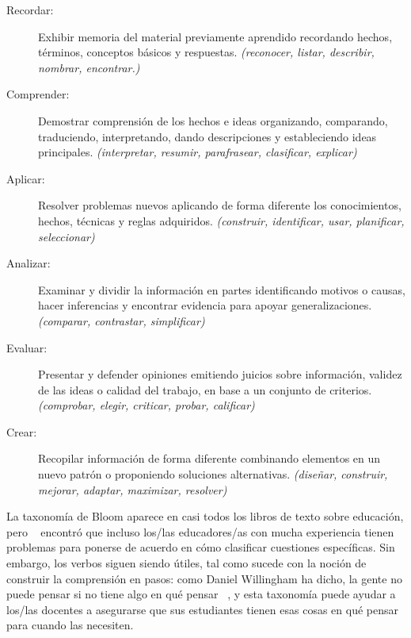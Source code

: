 \begin{description}
 
\item[Recordar:]
  Exhibir memoria del  material previamente aprendido
recordando hechos, términos,
conceptos básicos y respuestas.
  \emph{(reconocer, listar, describir, nombrar, encontrar.)}
 
\item[Comprender:]
  Demostrar comprensión de los hechos e ideas
organizando, comparando, traduciendo, interpretando, dando descripciones y estableciendo ideas principales.
  \emph{(interpretar, resumir, parafrasear, clasificar, explicar)}
 
\item[Aplicar:]
  Resolver problemas nuevos aplicando de forma diferente los conocimientos,
hechos, técnicas y reglas adquiridos.
  \emph{(construir, identificar, usar, planificar, seleccionar)}
 
\item[Analizar:]
  Examinar y dividir la información en partes identificando motivos o causas,
  hacer inferencias y encontrar evidencia para apoyar generalizaciones.
  \emph{(comparar, contrastar, simplificar)}
 
\item[Evaluar:]
  Presentar y defender opiniones emitiendo juicios sobre información,
  validez de las ideas
o calidad del trabajo, en base a un conjunto de criterios.
  \emph{(comprobar, elegir, criticar, probar, calificar)}
 
\item[Crear:]
 Recopilar información de forma diferente
combinando elementos en un nuevo patrón o proponiendo soluciones alternativas.
  \emph{(diseñar, construir, mejorar, adaptar, maximizar, resolver)}
 
\end{description}
 
La taxonomía de Bloom aparece en casi todos los libros de texto sobre educación,
pero ~\cite{Masa2018} encontró que
incluso los/las educadores/as con mucha experiencia tienen problemas para ponerse de acuerdo
en cómo clasificar cuestiones específicas.
Sin embargo, los verbos siguen siendo útiles, tal como sucede con
la noción de construir la comprensión en pasos:
como Daniel Willingham ha dicho, 
la gente no puede pensar si no tiene algo en qué pensar ~\cite{Will2010},
y esta taxonomía puede ayudar a los/las docentes a asegurarse
que sus estudiantes tienen esas cosas en qué pensar para cuando las necesiten.

